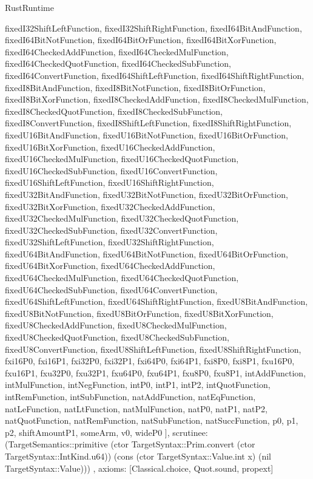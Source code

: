 \begin{lexlean}{RustRuntime}
\begin{semanticmodule}
{{      fixedI32ShiftLeftFunction,
      fixedI32ShiftRightFunction,
      fixedI64BitAndFunction,
      fixedI64BitNotFunction,
      fixedI64BitOrFunction,
      fixedI64BitXorFunction,
      fixedI64CheckedAddFunction,
      fixedI64CheckedMulFunction,
      fixedI64CheckedQuotFunction,
      fixedI64CheckedSubFunction,
      fixedI64ConvertFunction,
      fixedI64ShiftLeftFunction,
      fixedI64ShiftRightFunction,
      fixedI8BitAndFunction,
      fixedI8BitNotFunction,
      fixedI8BitOrFunction,
      fixedI8BitXorFunction,
      fixedI8CheckedAddFunction,
      fixedI8CheckedMulFunction,
      fixedI8CheckedQuotFunction,
      fixedI8CheckedSubFunction,
      fixedI8ConvertFunction,
      fixedI8ShiftLeftFunction,
      fixedI8ShiftRightFunction,
      fixedU16BitAndFunction,
      fixedU16BitNotFunction,
      fixedU16BitOrFunction,
      fixedU16BitXorFunction,
      fixedU16CheckedAddFunction,
      fixedU16CheckedMulFunction,
      fixedU16CheckedQuotFunction,
      fixedU16CheckedSubFunction,
      fixedU16ConvertFunction,
      fixedU16ShiftLeftFunction,
      fixedU16ShiftRightFunction,
      fixedU32BitAndFunction,
      fixedU32BitNotFunction,
      fixedU32BitOrFunction,
      fixedU32BitXorFunction,
      fixedU32CheckedAddFunction,
      fixedU32CheckedMulFunction,
      fixedU32CheckedQuotFunction,
      fixedU32CheckedSubFunction,
      fixedU32ConvertFunction,
      fixedU32ShiftLeftFunction,
      fixedU32ShiftRightFunction,
      fixedU64BitAndFunction,
      fixedU64BitNotFunction,
      fixedU64BitOrFunction,
      fixedU64BitXorFunction,
      fixedU64CheckedAddFunction,
      fixedU64CheckedMulFunction,
      fixedU64CheckedQuotFunction,
      fixedU64CheckedSubFunction,
      fixedU64ConvertFunction,
      fixedU64ShiftLeftFunction,
      fixedU64ShiftRightFunction,
      fixedU8BitAndFunction,
      fixedU8BitNotFunction,
      fixedU8BitOrFunction,
      fixedU8BitXorFunction,
      fixedU8CheckedAddFunction,
      fixedU8CheckedMulFunction,
      fixedU8CheckedQuotFunction,
      fixedU8CheckedSubFunction,
      fixedU8ConvertFunction,
      fixedU8ShiftLeftFunction,
      fixedU8ShiftRightFunction,
      fxi16P0,
      fxi16P1,
      fxi32P0,
      fxi32P1,
      fxi64P0,
      fxi64P1,
      fxi8P0,
      fxi8P1,
      fxu16P0,
      fxu16P1,
      fxu32P0,
      fxu32P1,
      fxu64P0,
      fxu64P1,
      fxu8P0,
      fxu8P1,
      intAddFunction,
      intMulFunction,
      intNegFunction,
      intP0,
      intP1,
      intP2,
      intQuotFunction,
      intRemFunction,
      intSubFunction,
      natAddFunction,
      natEqFunction,
      natLeFunction,
      natLtFunction,
      natMulFunction,
      natP0,
      natP1,
      natP2,
      natQuotFunction,
      natRemFunction,
      natSubFunction,
      natSuccFunction,
      p0,
      p1,
      p2,
      shiftAmountP1,
      someArm,
      v0,
      wideP0
    ],
    scrutinee: (TargetSemantics::primitive (ctor TargetSyntax::Prim.convert (ctor TargetSyntax::IntKind.u64)) (cons (ctor TargetSyntax::Value.int x) (nil TargetSyntax::Value)))
  },
  axioms: [Classical.choice, Quot.sound, propext]
}


\end{semanticmodule}
\end{lexlean}

